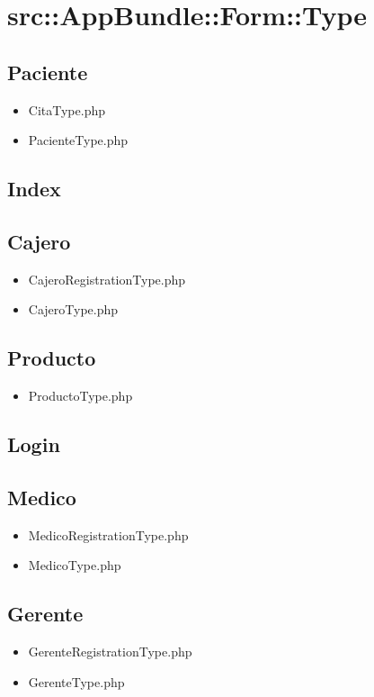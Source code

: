 	\section{src::AppBundle::Form::Type}
		\subsection{Paciente}
		\begin{itemize}
		\item CitaType.php
		\item PacienteType.php
		\end{itemize}
		\subsection{Index}
		\subsection{Cajero}
		\begin{itemize}
		\item CajeroRegistrationType.php
		\item CajeroType.php
		\end{itemize}
		\subsection{Producto}
		\begin{itemize}
		\item ProductoType.php
		\end{itemize}
		\subsection{Login}
		\subsection{Medico}
		\begin{itemize}
		\item MedicoRegistrationType.php
		\item MedicoType.php
		\end{itemize}
		
		\subsection{Gerente}
		\begin{itemize}
		\item GerenteRegistrationType.php
		\item GerenteType.php
		\end{itemize}
		
